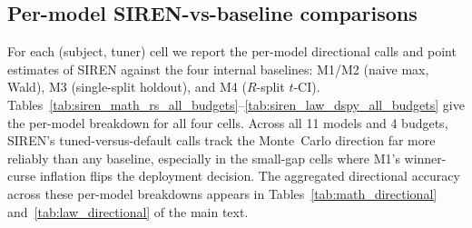 \FloatBarrier

\subsection{Per-model SIREN-vs-baseline comparisons}
\label{sec:appendix_siren_per_model}

For each (subject, tuner) cell we report the per-model directional calls
and point estimates of SIREN against the four internal baselines: M1/M2
(naive max, Wald), M3 (single-split holdout), and M4 ($R$-split $t$-CI).
Tables~\ref{tab:siren_math_rs_all_budgets}--\ref{tab:siren_law_dspy_all_budgets}
give the per-model breakdown for all four cells. Across all 11 models and
4 budgets, SIREN's tuned-versus-default calls track the Monte~Carlo
direction far more reliably than any baseline, especially in the small-gap
cells where M1's winner-curse inflation flips the deployment decision.
The aggregated directional accuracy across these per-model breakdowns
appears in Tables~\ref{tab:math_directional} and~\ref{tab:law_directional}
of the main text.

\FloatBarrier

